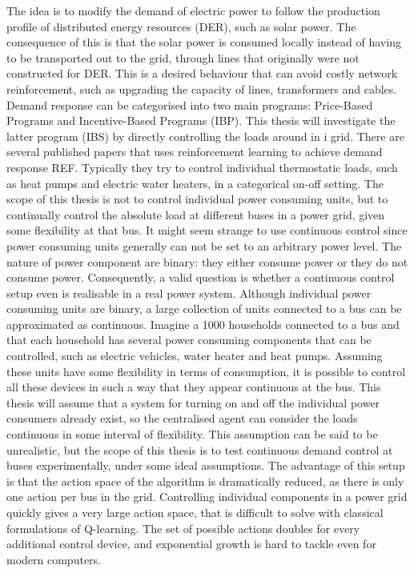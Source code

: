 \documentclass[class=book, crop=false]{standalone}
\begin{document}
The idea is to modify the demand of electric power to follow the production profile of distributed energy resources (DER), such as solar power. The consequence of this is that the solar power is consumed locally instead of having to be transported out to the grid, through lines that originally were not constructed for DER. This is a desired behaviour that can avoid costly network reinforcement, such as upgrading the capacity of lines, transformers and cables\cite{active_network_management}. Demand response can be categorised into two main programs: Price-Based Programs and Incentive-Based Programs (IBP)\cite{demand_response_definition}. This thesis will investigate the latter program (IBS) by directly controlling the loads around in i grid. There are several published papers that uses reinforcement learning to achieve demand response REF\cite{thermo_q_learning}. Typically they try to control individual thermostatic loads, such as heat pumps and electric water heaters, in a categorical on-off setting. The scope of this thesis is not to control individual power consuming units, but to continually control the absolute load at different buses in a power grid, given some flexibility at that bus. It might seem strange to use continuous control since power consuming units generally can not be set to an arbitrary power level. The nature of power component are binary: they either consume power or they do not consume power. Consequently, a valid question is whether a continuous control setup even is realisable in a real power system. Although individual power consuming units are binary, a large collection of units connected to a bus can be approximated as continuous. Imagine a 1000 households connected to a bus and that each household has several power consuming components that can be controlled, such as electric vehicles, water heater and heat pumps. Assuming these units have some flexibility in terms of consumption, it is possible to control all these devices in such a way that they appear continuous at the bus. This thesis will assume that a system for turning on and off the individual power consumers already exist, so the centralised agent can consider the loads continuous in some interval of flexibility. This assumption can be said to be unrealistic, but the scope of this thesis is to test continuous demand control at buses experimentally, under some ideal assumptions. The advantage of this setup is that the action space of the algorithm is dramatically reduced, as there is only one action per bus in the grid. Controlling individual components in a power grid quickly gives a very large action space, that is difficult to solve with classical formulations of Q-learning. The set of possible actions doubles for every additional control device, and exponential growth is hard to tackle even for modern computers.
\end{document}
